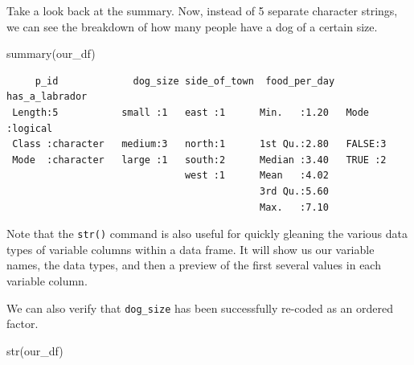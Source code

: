 \documentclass[
  letterpaper,
  DIV=11,
  numbers=noendperiod]{scrreprt}
\newenvironment{Shaded}{\begin{snugshade}}{\end{snugshade}}
\newcommand{\AttributeTok}[1]{\textcolor[rgb]{0.40,0.45,0.13}{#1}}
\newcommand{\ConstantTok}[1]{\textcolor[rgb]{0.56,0.35,0.01}{#1}}
\newcommand{\FunctionTok}[1]{\textcolor[rgb]{0.28,0.35,0.67}{#1}}
\newcommand{\NormalTok}[1]{\textcolor[rgb]{0.00,0.23,0.31}{#1}}
\newcommand{\OtherTok}[1]{\textcolor[rgb]{0.00,0.23,0.31}{#1}}
\newcommand{\SpecialCharTok}[1]{\textcolor[rgb]{0.37,0.37,0.37}{#1}}
\newcommand{\StringTok}[1]{\textcolor[rgb]{0.13,0.47,0.30}{#1}}
\begin{document}
\begin{Shaded}
\end{Shaded}

Take a look back at the summary. Now, instead of 5 separate character
strings, we can see the breakdown of how many people have a dog of a
certain size.

\begin{Shaded}
\begin{Highlighting}[]
\FunctionTok{summary}\NormalTok{(our\_df)}
\end{Highlighting}
\end{Shaded}

\begin{verbatim}
     p_id             dog_size side_of_town  food_per_day  has_a_labrador 
 Length:5           small :1   east :1      Min.   :1.20   Mode :logical  
 Class :character   medium:3   north:1      1st Qu.:2.80   FALSE:3        
 Mode  :character   large :1   south:2      Median :3.40   TRUE :2        
                               west :1      Mean   :4.02                  
                                            3rd Qu.:5.60                  
                                            Max.   :7.10                  
\end{verbatim}

Note that the \texttt{str()} command is also useful for quickly gleaning
the various data types of variable columns within a data frame. It will
show us our variable names, the data types, and then a preview of the
first several values in each variable column.

We can also verify that \texttt{dog\_size} has been successfully
re-coded as an ordered factor.

\begin{Shaded}
\begin{Highlighting}[]
\FunctionTok{str}\NormalTok{(our\_df)}
\end{Highlighting}
\end{Shaded}
\end{document}
